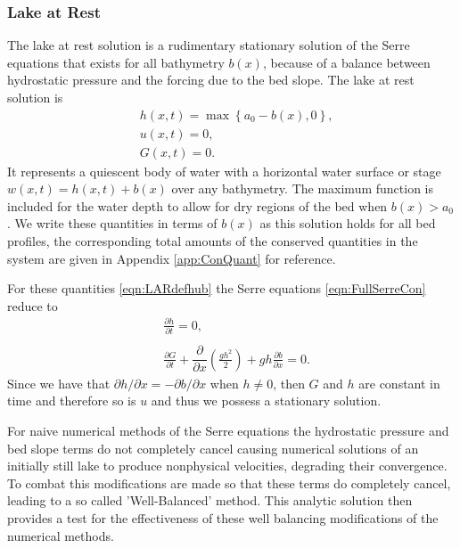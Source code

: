 \subsubsection{Lake at Rest}
The lake at rest solution is a rudimentary stationary solution of the Serre equations that exists for all bathymetry $b(x)$, because of a balance between hydrostatic pressure and the forcing due to the bed slope. The lake at rest solution is
\begin{subequations}
	\begin{align}
	&h(x,t) = \max\left\lbrace a_0 - b(x), 0 \right\rbrace, \\
	&u(x,t) = 0 , \\
	&G(x,t) = 0 .
	\end{align}
	\label{eqn:LARdefhub}
\end{subequations}
It represents a quiescent body of water with a horizontal water surface or stage $w(x,t) = h(x,t) + b(x)$ over any bathymetry. The maximum function is included for the water depth to allow for dry regions of the bed when $b(x) > a_0$. We write these quantities in terms of $b(x)$ as this solution holds for all bed profiles, the corresponding total amounts of the conserved quantities in the system are given in Appendix \ref{app:ConQuant} for reference. 

For these quantities \eqref{eqn:LARdefhub} the Serre equations \eqref{eqn:FullSerreCon} reduce to
\begin{align*}
& \frac{\partial h}{\partial t}  = 0 , \\  \nonumber \\
&\frac{\partial G}{\partial t}  +\dfrac{\partial}{\partial x} \left(\frac{gh^2}{2}\right) + gh \frac{\partial b}{\partial x} = 0.
\end{align*}
Since we have that $\partial h / \partial x =  - \partial b / \partial x$ when $h \neq 0$, then $G$ and $h$ are constant in time and therefore so is $u$ and thus we possess a stationary solution. 

For naive numerical methods of the Serre equations the hydrostatic pressure and bed slope terms do not completely cancel causing numerical solutions of an initially still lake to produce nonphysical velocities, degrading their convergence. To combat this modifications are made so that these terms do completely cancel, leading to a so called 'Well-Balanced' method. This analytic solution then provides a test for the effectiveness of these well balancing modifications of the numerical methods.


